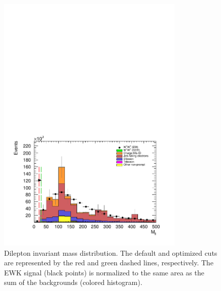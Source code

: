 \begin{figure}[htp]
  \centering
  \includegraphics[width=0.8\textwidth]{figs/ssww_upgrade/optimization_plots/mll}
  \caption{Dilepton invariant mass distribution.  The default and optimized cuts are represented by the red and green dashed lines, respectively.  The \ssww EWK signal (black points) is normalized to the same area as the sum of the backgrounds (colored histogram). }
  \label{fig:optimized_mll}
\end{figure}

